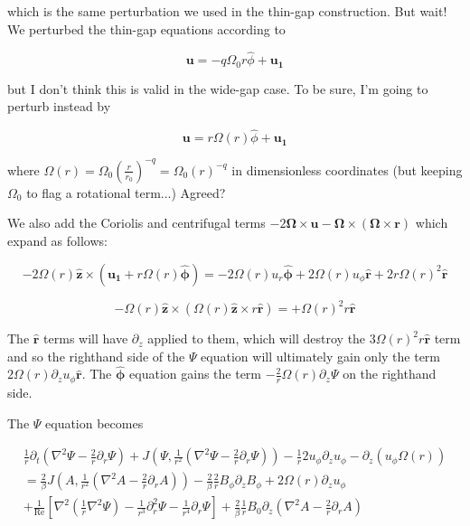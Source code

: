 \documentclass{paper}
\newcommand{\beq}{\begin{equation}}
\newcommand{\eeq}{\end{equation}}
\newcommand{\rhat}{\ensuremath{\mathbf{\hat{r}}}}
\newcommand{\phihat}{\ensuremath{\mathbf{\hat{\phi}}}}
\newcommand{\zhat}{\ensuremath{\mathbf{\hat{z}}}}
\newcommand\reye{\mathrm{Re}}
\begin{document}
which is the same perturbation we used in the thin-gap construction. But wait! We perturbed the thin-gap equations according to 

\beq
\mathbf{u} = -q \Omega_0 r \hat{\phi} + \mathbf{u_1}
\eeq

but I don't think this is valid in the wide-gap case. To be sure, I'm going to perturb instead by 

\beq
\mathbf{u} = r\Omega(r)\hat{\phi}+ \mathbf{u_1}
\eeq

where $\Omega(r) = \Omega_0 \left(\frac{r}{r_0}\right)^{-q} = \Omega_0 \left(r\right)^{-q}$ in dimensionless coordinates (but keeping $\Omega_0$ to flag a rotational term...) Agreed?

We also add the Coriolis and centrifugal terms $-2 \mathbf{\Omega} \times \mathbf{u} - \mathbf{\Omega} \times \left(\mathbf{\Omega} \times \mathbf{r}\right)$ which expand as follows:

\beq
-2\Omega(r)\zhat \times \left( \mathbf{u_1} + r\Omega(r)\phihat\right) = -2\Omega(r)u_{r}\phihat + 2\Omega(r)u_\phi\rhat + 2r\Omega(r)^2\rhat
\eeq

\beq
-\Omega(r)\zhat \times \left(\Omega(r)\zhat \times r\rhat\right) = +\Omega(r)^2 r \rhat
\eeq

The $\rhat$ terms will have $\partial_z$ applied to them, which will destroy the $3\Omega(r)^2 r \rhat$ term and so the righthand side of the $\Psi$ equation will ultimately gain only the term $2 \Omega(r) \partial_z u_\phi \rhat$. The $\phihat$ equation gains the term $-\frac{2}{r} \Omega(r) \partial_z \Psi$ on the righthand side. 

The $\Psi$ equation becomes

\begin{multline}
\label{eq:Psi_perturbed}
\frac{1}{r}\partial_t \left(\nabla^2 \Psi - \frac{2}{r} \partial_r \Psi \right) + J\left(\Psi, \frac{1}{r^2} \left( \nabla^2 \Psi - \frac{2}{r} \partial_r\Psi\right) \right) - \frac{1}{r} 2 u_\phi \partial_z u_\phi - \partial_z\left(u_\phi \Omega(r) \right)\\
= \frac{2}{\beta} J\left(A, \frac{1}{r^2} \left( \nabla^2 A - \frac{2}{r} \partial_rA\right) \right) - \frac{2}{\beta} \frac{2}{r}B_\phi \partial_z B_\phi + 2 \Omega(r) \partial_z u_\phi \\
+ \frac{1}{\reye} \left[ \nabla^2 \left(\frac{1}{r} \nabla^2 \Psi\right) - \frac{1}{r^3} \partial_r^2 \Psi - \frac{1}{r^4}\partial_r\Psi\right] + \frac{2}{\beta} \frac{1}{r}B_0 \partial_z \left(\nabla^2 A - \frac{2}{r} \partial_r A\right) 
\end{multline}
\end{document}
